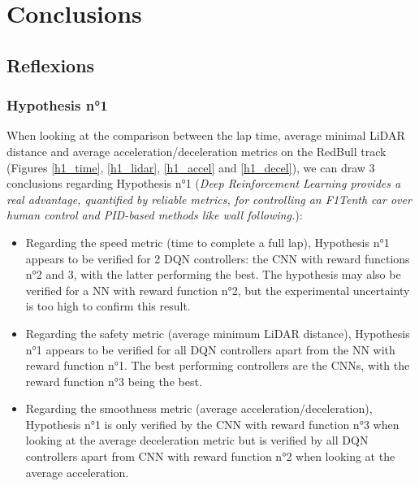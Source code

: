 
\chapter{Conclusions} %

\label{Chapter8} %



\section{Reflexions}
\subsection{Hypothesis n°1}
\label{reflexions_h1}
When looking at the comparison between the lap time, average minimal LiDAR distance and average acceleration/deceleration metrics on the RedBull track (Figures \ref{h1_time}, \ref{h1_lidar}, \ref{h1_accel} and \ref{h1_decel}), we can draw 3 conclusions regarding Hypothesis n°1 (\textit{Deep Reinforcement Learning provides a real advantage, quantified by reliable metrics, for controlling an F1Tenth car over human control and PID-based methods like wall following.}):
\begin{itemize}
	\item  Regarding the speed metric (time to complete a full lap), Hypothesis n°1 appears to be verified for 2 DQN controllers: the CNN with reward functions n°2 and 3, with the latter performing the best. The hypothesis may also be verified for a NN with reward function n°2, but the experimental uncertainty is too high to confirm this result.
	\item Regarding the safety metric (average minimum LiDAR distance), Hypothesis n°1 appears to be verified for all DQN controllers apart from the NN with reward function n°1. The best performing controllers are the CNNs, with the reward function n°3 being the best.
	\item Regarding the smoothness metric (average acceleration/deceleration), Hypothesis n°1 is only verified by the CNN with reward function n°3 when looking at the average deceleration metric but is verified by all DQN controllers apart from CNN with reward function n°2 when looking at the average acceleration. 
\end{itemize}

